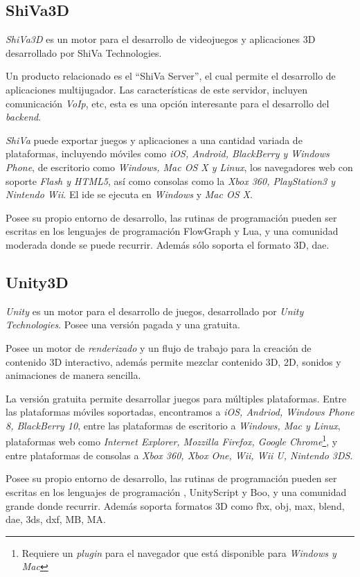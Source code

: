 \subsection{ShiVa3D}

\textit{ShiVa3D} es un motor para el desarrollo de videojuegos y aplicaciones 
3D desarrollado por ShiVa Technologies\cite{shiva}.

Un producto relacionado es el \enquote{ShiVa Server}, el cual permite el
desarrollo de aplicaciones multijugador. Las características de este servidor,
incluyen comunicación \textit{VoIp}, etc\cite{shiva}, esta es
una opción interesante para el desarrollo del \textit{backend}.

\textit{ShiVa} puede exportar juegos y aplicaciones a una cantidad variada de 
plataformas, incluyendo móviles como \textit{iOS, Android, BlackBerry y Windows
Phone}, de escritorio como \textit{Windows, Mac OS X y Linux}, los
navegadores web con soporte \textit{Flash y HTML5}, así como consolas como la
\textit{Xbox 360, PlayStation3 y Nintendo Wii}. El \Gls{ide} se ejecuta en
\textit{Windows} y \textit{Mac OS X}\cite{shiva}. 

Posee su propio entorno de desarrollo, las rutinas de programación pueden ser 
escritas en los lenguajes de programación FlowGraph y Lua, y una 
comunidad moderada donde se puede recurrir. Además sólo soporta el formato 
3D, dae\cite{shiva}.


\subsection{Unity3D}

\textit{Unity} es un motor para el desarrollo de juegos, desarrollado por
\textit{Unity Technologies}. Posee una versión pagada y una
gratuita\cite{unity3d}.

Posee un motor de \textit{renderizado} y un flujo de trabajo para la creación de
contenido 3D interactivo, además permite mezclar contenido 3D, 2D, sonidos y
animaciones de manera sencilla\cite{unity3d}.

La versión gratuita permite desarrollar juegos para múltiples plataformas. 
Entre las plataformas móviles soportadas, encontramos a \textit{iOS, Andriod, 
Windows Phone 8, BlackBerry 10}, entre las plataformas de escritorio a 
\textit{Windows, Mac y Linux}, plataformas web como \textit{Internet Explorer,
    Mozzilla Firefox, Google Chrome}\footnote{Requiere un \textit{plugin} para
    el navegador que está disponible para \textit{Windows y Mac}}, y entre
plataformas de consolas a \textit{Xbox 360, Xbox One, Wii, Wii U, Nintendo
    3DS}\cite{unity3d}.

Posee su propio entorno de desarrollo, las rutinas de programación pueden ser 
escritas en los lenguajes de programación \cs{}, UnityScript y Boo, y una 
comunidad grande donde recurrir. Además soporta formatos 3D como fbx, obj, max, 
blend, dae, 3ds, dxf, MB, MA\cite{unity3d}.

